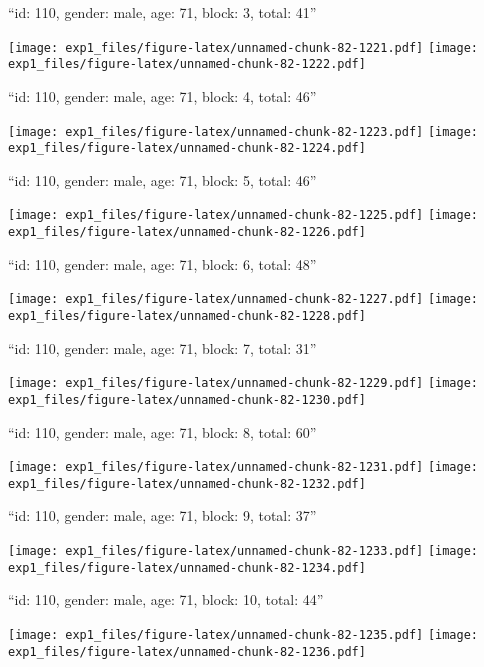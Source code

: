 \documentclass[11pt,,]{article}
\begin{document}
\newpage
[1] 

``id: 110, gender: male, age: 71, block: 3, total: 41''

\texttt{[image: exp1\_files/figure-latex/unnamed-chunk-82-1221.pdf]}
\texttt{[image: exp1\_files/figure-latex/unnamed-chunk-82-1222.pdf]}

\newpage
[1] 

``id: 110, gender: male, age: 71, block: 4, total: 46''

\texttt{[image: exp1\_files/figure-latex/unnamed-chunk-82-1223.pdf]}
\texttt{[image: exp1\_files/figure-latex/unnamed-chunk-82-1224.pdf]}

\newpage
[1] 

``id: 110, gender: male, age: 71, block: 5, total: 46''

\texttt{[image: exp1\_files/figure-latex/unnamed-chunk-82-1225.pdf]}
\texttt{[image: exp1\_files/figure-latex/unnamed-chunk-82-1226.pdf]}

\newpage
[1] 

``id: 110, gender: male, age: 71, block: 6, total: 48''

\texttt{[image: exp1\_files/figure-latex/unnamed-chunk-82-1227.pdf]}
\texttt{[image: exp1\_files/figure-latex/unnamed-chunk-82-1228.pdf]}

\newpage
[1] 

``id: 110, gender: male, age: 71, block: 7, total: 31''

\texttt{[image: exp1\_files/figure-latex/unnamed-chunk-82-1229.pdf]}
\texttt{[image: exp1\_files/figure-latex/unnamed-chunk-82-1230.pdf]}

\newpage
[1] 

``id: 110, gender: male, age: 71, block: 8, total: 60''

\texttt{[image: exp1\_files/figure-latex/unnamed-chunk-82-1231.pdf]}
\texttt{[image: exp1\_files/figure-latex/unnamed-chunk-82-1232.pdf]}

\newpage
[1] 

``id: 110, gender: male, age: 71, block: 9, total: 37''

\texttt{[image: exp1\_files/figure-latex/unnamed-chunk-82-1233.pdf]}
\texttt{[image: exp1\_files/figure-latex/unnamed-chunk-82-1234.pdf]}

\newpage
[1] 

``id: 110, gender: male, age: 71, block: 10, total: 44''

\texttt{[image: exp1\_files/figure-latex/unnamed-chunk-82-1235.pdf]}
\texttt{[image: exp1\_files/figure-latex/unnamed-chunk-82-1236.pdf]}
\end{document}
